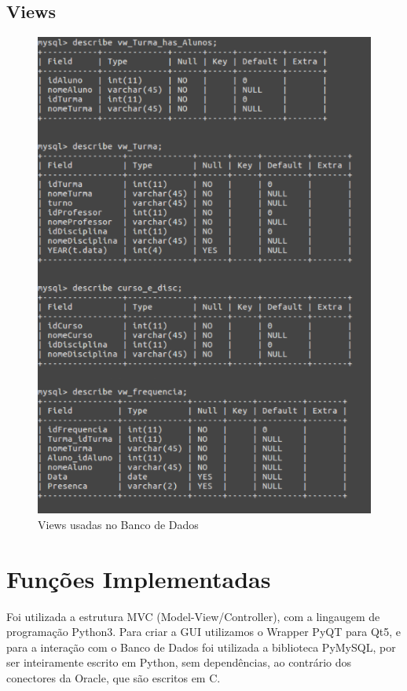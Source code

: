\documentclass[12pt]{article}
\begin{document}
\subsection{Views}
\begin{figure}[!htb]
\centering
\includegraphics[width=1\textwidth]{views_Final.png}
\caption{Views usadas no Banco de Dados}
\label{fig:exampleFig4}
\end{figure}
\clearpage 

\section{Funções Implementadas}\label{sec:funcimp}

Foi utilizada a estrutura MVC (Model-View/Controller), com a lingaugem de programação Python3. Para criar a GUI utilizamos o Wrapper PyQT para Qt5, e para a interação com o Banco de Dados foi utilizada a biblioteca PyMySQL, por ser inteiramente escrito em Python, sem dependências, ao contrário dos conectores da Oracle, que são escritos em C.
\end{document}

